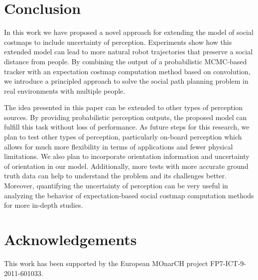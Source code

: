 \section{Conclusion}
\label{sec:conclusion}

In this work we have proposed a novel approach for extending the model of social costmaps to include uncertainty of perception. Experiments show how this extended model can lead to more natural robot trajectories that preserve a social distance from people. By combining the output of a probabilistic MCMC-based tracker with an expectation costmap computation method based on convolution, we introduce a principled approach to solve the social path planning problem in real environments with multiple people. 

The idea presented in this paper can be extended to other types of perception sources. By providing probabilistic perception outputs, the proposed model can fulfill this task without loss of performance. As future steps for this research, we plan to test other types of perception, particularly on-board perception which allows for much more flexibility in terms of applications and fewer physical limitations. We also plan to incorporate orientation information and uncertainty of orientation in our model. Additionally, more tests with more accurate ground truth data can help to understand the problem and its challenges better. Moreover, quantifying the uncertainty of perception can be very useful in analyzing the behavior of expectation-based social costmap computation methods for more in-depth studies.  


\section*{Acknowledgements}

This work has been supported by the European MOnarCH project FP7-ICT-9-2011-601033. 